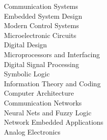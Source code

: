  {} 
    Communication Systems     
\\  Embedded System Design  
\\  Modern Control Systems  
\\  Microelectronic Circuits  
\\  Digital Design
\\  Microprocessors and Interfacing 
\\  Digital Signal Processing
\\  Symbolic Logic 
\\  Information Theory and Coding
\\  Computer Architecture 
\\  Communication Networks
\\  Neural Nets and Fuzzy Logic 
\\  Network Embedded Applications
\\  Analog Electronics 
